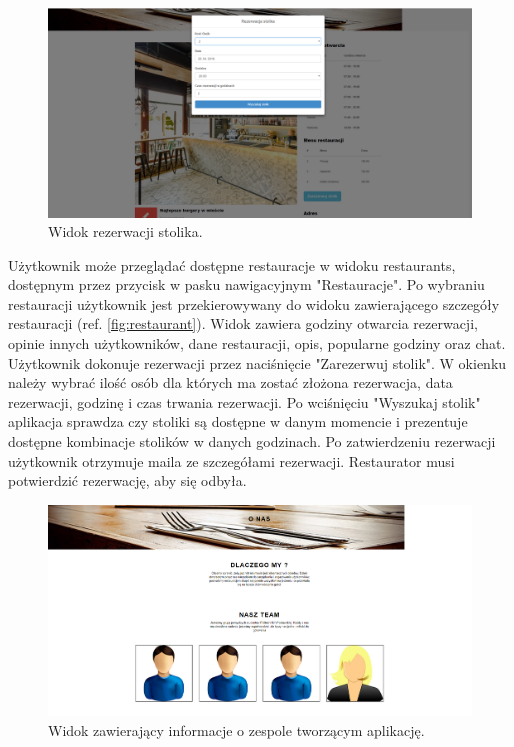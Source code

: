 \documentclass{article}
\begin{document}
\begin{figure}[H]
\centering
	\includegraphics[width=1.00\textwidth]{screens/reservation.png}
	\caption[caption]{Widok rezerwacji stolika.}
	\label{fig:reservation}
\end{figure}

Użytkownik może przeglądać dostępne restauracje w widoku restaurants, dostępnym przez przycisk w pasku nawigacyjnym "Restauracje". Po wybraniu restauracji użytkownik jest przekierowywany do widoku zawierającego szczegóły restauracji (ref. \ref{fig:restaurant}). Widok zawiera godziny otwarcia rezerwacji, opinie innych użytkowników, dane restauracji, opis, popularne godziny oraz chat. Użytkownik dokonuje rezerwacji przez naciśnięcie "Zarezerwuj stolik". W okienku należy wybrać ilość osób dla których ma zostać złożona rezerwacja, data rezerwacji, godzinę i czas trwania rezerwacji. Po wciśnięciu "Wyszukaj stolik" aplikacja sprawdza czy stoliki są dostępne w danym momencie i prezentuje dostępne kombinacje stolików w danych godzinach. Po zatwierdzeniu rezerwacji użytkownik otrzymuje maila ze szczegółami rezerwacji. Restaurator musi potwierdzić rezerwację, aby się odbyła.

\begin{figure}[H]
\centering
	\includegraphics[width=1.00\textwidth]{screens/about.png}
	\caption[caption]{Widok zawierający informacje o zespole tworzącym aplikację.}
	\label{fig:about}
\end{figure}
\end{document}

